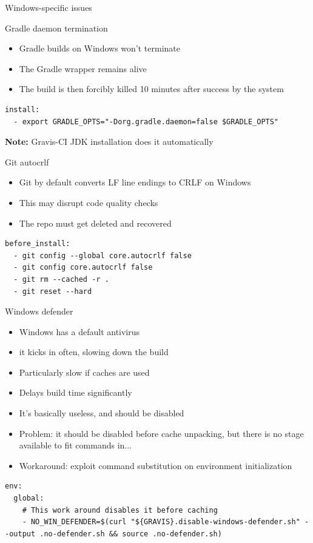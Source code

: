 \documentclass[presentation]{beamer}
\begin{document}
\begin{frame}{Windows-specific issues}
    \begin{block}{Gradle daemon termination}
        \begin{itemize}
            \item Gradle builds on Windows won't terminate
            \item The Gradle wrapper remains alive
            \item The build is then forcibly killed 10 minutes after success by the system
        \end{itemize}
        \begin{verbatim}
install:
  - export GRADLE_OPTS="-Dorg.gradle.daemon=false $GRADLE_OPTS"
        \end{verbatim}
        \textbf{Note:} Gravis-CI JDK installation does it automatically
    \end{block}
    \begin{block}{Git autocrlf}
        \begin{itemize}
            \item Git by default converts LF line endings to CRLF on Windows
            \item This may disrupt code quality checks
            \item The repo must get deleted and recovered
        \end{itemize}
        \begin{verbatim}
before_install:
  - git config --global core.autocrlf false
  - git config core.autocrlf false
  - git rm --cached -r .
  - git reset --hard
        \end{verbatim}
    \end{block}
    \begin{block}{Windows defender}
        \begin{itemize}
            \item Windows has a default antivirus
            \item it kicks in often, slowing down the build
            \item Particularly slow if caches are used
            \item Delays build time significantly
            \item It's basically useless, and should be disabled
            \item Problem: it should be disabled before cache unpacking, but there is no stage available to fit commands in...
            \item Workaround: exploit command substitution on environment initialization
        \end{itemize}
        \begin{verbatim}
env:
  global:
    # This work around disables it before caching
    - NO_WIN_DEFENDER=$(curl "${GRAVIS}.disable-windows-defender.sh" --output .no-defender.sh && source .no-defender.sh)
        \end{verbatim}
    \end{block}
\end{frame}
\end{document}
